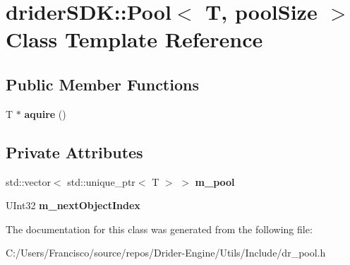 \hypertarget{classdrider_s_d_k_1_1_pool}{}\section{drider\+S\+DK\+:\+:Pool$<$ T, pool\+Size $>$ Class Template Reference}
\label{classdrider_s_d_k_1_1_pool}
\subsection*{Public Member Functions}
\begin{DoxyCompactItemize}
\item 
\mbox{\label{classdrider_s_d_k_1_1_pool_af13ebb482203072260ddea104b4f433e}} 
T $\ast$ {\bfseries aquire} ()
\end{DoxyCompactItemize}
\subsection*{Private Attributes}
\begin{DoxyCompactItemize}
\item 
\mbox{\label{classdrider_s_d_k_1_1_pool_a9634dac3a39c5fcd26f8a54e26b04082}} 
std\+::vector$<$ std\+::unique\+\_\+ptr$<$ T $>$ $>$ {\bfseries m\+\_\+pool}
\item 
\mbox{\label{classdrider_s_d_k_1_1_pool_a12c1fa9f40c34670736e4ae535afbf83}} 
U\+Int32 {\bfseries m\+\_\+next\+Object\+Index}
\end{DoxyCompactItemize}


The documentation for this class was generated from the following file\+:\begin{DoxyCompactItemize}
\item 
C\+:/\+Users/\+Francisco/source/repos/\+Drider-\/\+Engine/\+Utils/\+Include/dr\+\_\+pool.\+h\end{DoxyCompactItemize}
